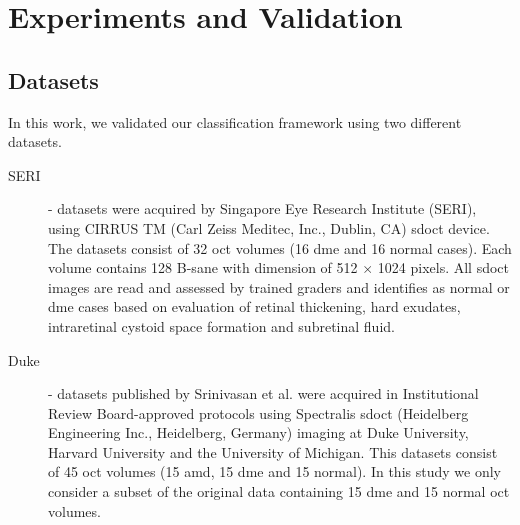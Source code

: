 
\section{Experiments and Validation}\label{sec:exp}

\subsection{Datasets}

In this work, we validated our classification framework using two different datasets.

\begin{description}

\item[SERI]- datasets were acquired by Singapore Eye Research Institute (SERI), using CIRRUS TM (Carl Zeiss Meditec, Inc., Dublin, CA) \ac{sdoct} device. The datasets consist of 32 \ac{oct} volumes (16 \ac{dme} and 16 normal cases). Each volume contains 128 B-sane with  dimension of 512 $\times$ 1024 pixels.  All \ac{sdoct} images are read and assessed by trained graders and identifies as normal or \ac{dme} cases based on evaluation of retinal thickening, hard exudates, intraretinal cystoid space formation and subretinal fluid.

\item[Duke] - datasets published by Srinivasan et al. \cite{Srinivasan2014} were acquired in Institutional Review Board-approved protocols using Spectralis \ac{sdoct} (Heidelberg Engineering Inc., Heidelberg, Germany) imaging at Duke University, Harvard University and the University of Michigan. This datasets consist of 45 \ac{oct} volumes (15 \ac{amd}, 15 \ac{dme} and 15 normal). In this study we only consider a subset of the original data containing 15 \ac{dme} and 15 normal \ac{oct} volumes.

\end{description}

